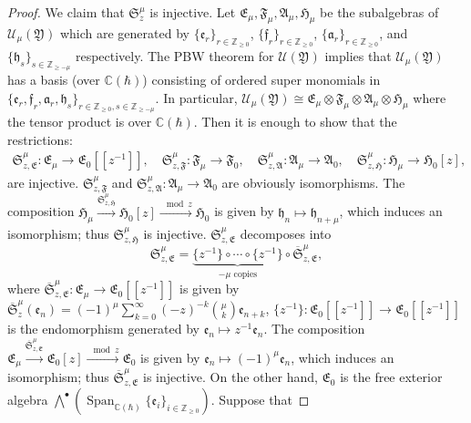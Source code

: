 \documentclass[10pt]{amsart}
\theoremstyle{definition}
\numberwithin{equation}{section}
\newcommand{\bC}{\mathbb{C}}
\newcommand{\bZ}{\mathbb{Z}}
\newcommand{\Span}{\operatorname{Span}}
\begin{document}
\begin{proof}
We claim that $\mathfrak{S}_z^\mu$ is injective. Let $\mathfrak{E}_\mu,\mathfrak{F}_\mu,\mathfrak{A}_\mu,\mathfrak{H}_\mu$ be the subalgebras of $\mathcal U_\mu(\mathfrak{Y})$ which are generated by $\{\mathfrak{e}_r\}_{r\in \bZ_{\geqslant0}}$, $\{\mathfrak{f}_r\}_{r\in \bZ_{\geqslant0}}$, $\{\mathfrak{a}_r\}_{r\in \bZ_{\geqslant0}}$, and $\{\mathfrak{h}_s\}_{s\in \bZ_{\geqslant-\mu}}$ respectively. The PBW theorem for $\mathcal U(\mathfrak{Y})$ implies that $\mathcal U_\mu(\mathfrak{Y})$ has a basis (over $\bC(\hbar)$) consisting of ordered super monomials in $\{\mathfrak{e}_r,\mathfrak{f}_r,\mathfrak{a}_r,\mathfrak{h}_s\}_{r\in \bZ_{\geqslant0},s\in \bZ_{\geqslant-\mu}}$. In particular, $\mathcal U_\mu(\mathfrak{Y})\cong \mathfrak{E}_\mu\otimes\mathfrak{F}_\mu\otimes\mathfrak{A}_\mu\otimes\mathfrak{H}_\mu$ where the tensor product is over $\bC(\hbar)$. Then it is enough to show that the restrictions:
\begin{align*}
\mathfrak{S}_{z,\mathfrak{E}}^\mu\colon \mathfrak{E}_\mu\to \mathfrak{E}_0 [\![z^{-1}]\!],\quad \mathfrak{S}_{z,\mathfrak{F}}^\mu\colon \mathfrak{F}_\mu\to \mathfrak{F}_0,\quad \mathfrak{S}_{z,\mathfrak{A}}^\mu\colon \mathfrak{A}_\mu\to \mathfrak{A}_0,\quad \mathfrak{S}_{z,\mathfrak{H}}^\mu\colon \mathfrak{H}_\mu\to \mathfrak{H}_0[z],
\end{align*}
are injective. $\mathfrak{S}_{z,\mathfrak{F}}^\mu$ and $\mathfrak{S}_{z,\mathfrak{A}}^\mu\colon \mathfrak{A}_\mu\to \mathfrak{A}_0$ are obviously isomorphisms. The composition $\mathfrak{H}_\mu\xrightarrow{\mathfrak{S}_{z,\mathfrak{H}}^\mu} \mathfrak{H}_0[z]\xrightarrow{\mod z}\mathfrak{H}_0$ is given by $\mathfrak{h}_n\mapsto \mathfrak{h}_{n+\mu}$, which induces an isomorphism; thus $\mathfrak{S}_{z,\mathfrak{H}}^\mu$ is injective. $\mathfrak{S}_{z,\mathfrak{E}}^\mu$ decomposes into $$\mathfrak{S}_{z,\mathfrak{E}}^\mu=\underbrace{\{z^{-1}\}\circ\cdots\circ\{z^{-1}\}}_{-\mu\text{ copies}}\circ \overline{\mathfrak{S}}_{z,\mathfrak{E}}^\mu,$$ where $\overline{\mathfrak{S}}_{z,\mathfrak{E}}^\mu\colon \mathfrak{E}_\mu\to \mathfrak{E}_0 [\![z^{-1}]\!]$ is given by $\overline{\mathfrak{S}}_z^\mu(\mathfrak{e}_n)=(-1)^{\mu}\sum_{k=0}^{\infty}(-z)^{-k}\binom{\mu}{k}\mathfrak{e}_{n+k}$, $\{z^{-1}\}\colon \mathfrak{E}_0 [\![z^{-1}]\!]\to \mathfrak{E}_0 [\![z^{-1}]\!]$ is the endomorphism generated by $\mathfrak{e}_n\mapsto z^{-1}\mathfrak{e}_n$. The composition $\mathfrak{E}_\mu\xrightarrow{\overline{\mathfrak{S}}_{z,\mathfrak{E}}^\mu} \mathfrak{E}_0[z]\xrightarrow{\mod z}\mathfrak{E}_0$ is given by $\mathfrak{e}_n\mapsto (-1)^{\mu}\mathfrak{e}_{n}$, which induces an isomorphism; thus $\overline{\mathfrak{S}}_{z,\mathfrak{E}}^\mu$ is injective. On the other hand, $\mathfrak{E}_0$ is the free exterior algebra $\bigwedge^\bullet\left(\Span_{\bC(\hbar)}\{\mathfrak{e}_i\}_{i\in \bZ_{\geqslant 0}}\right)$. Suppose that

\end{proof}
\end{document}
